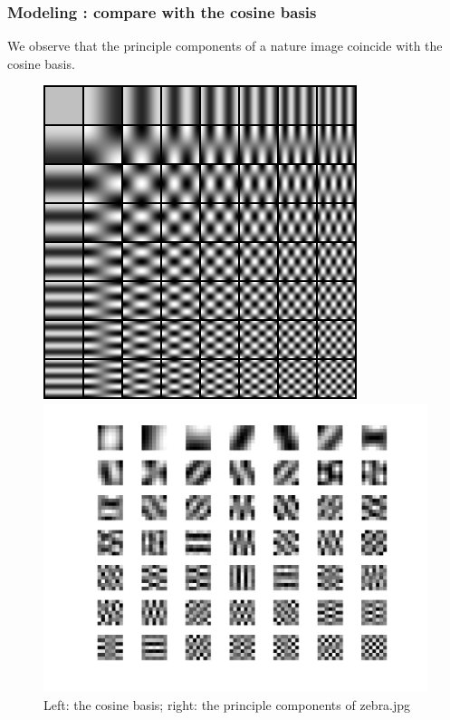 \documentclass[compress]{beamer} %
\begin{document}
 \begin{frame}
  \frametitle{Modeling : compare with the cosine basis}
We observe that the principle components of a nature image coincide with the cosine basis.
  \begin{figure}[h!]
    \centering
    \begin{minipage}{0.4\linewidth}
    \includegraphics[width=\linewidth]{cosinus_basis.png}
    \end{minipage}
    \begin{minipage}{0.4\linewidth}
    \includegraphics[width=\linewidth]{princomp_lena.png}
    \end{minipage}
      \caption{Left: the cosine basis; right: the principle components of zebra.jpg}
  \end{figure}      
 \end{frame}
 
\end{document}
